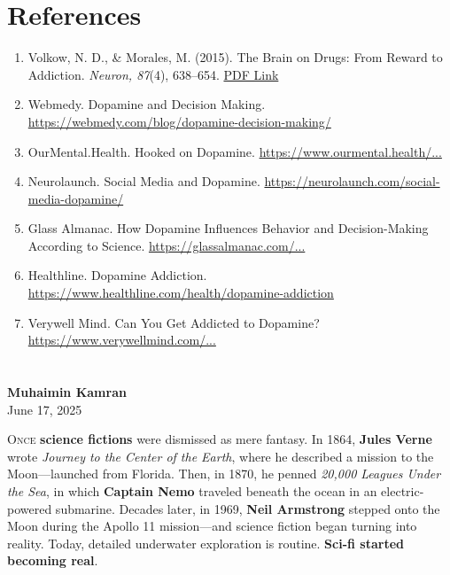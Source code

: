 \documentclass[a4paper,10pt,twocolumn]{memoir}
\newcommand{\article}[3]{
  \section*{#1}
  \addcontentsline{toc}{section}{#1}
  \begin{center}
    \color{dark}\normalsize\textbf{#2}\\
    \small\color{gray}#3
  \end{center}
  \vspace{-0.8em}  %
}
\begin{document}
\section*{References}

\begin{enumerate}
    \item Volkow, N. D., \& Morales, M. (2015). The Brain on Drugs: From Reward to Addiction. \textit{Neuron, 87}(4), 638–654. \href{https://www.cell.com/neuron/pdf/S0896-6273(15)00133-6.pdf}{PDF Link}
    \item Webmedy. Dopamine and Decision Making. \href{https://webmedy.com/blog/dopamine-decision-making/}{https://webmedy.com/blog/dopamine-decision-making/}
    \item OurMental.Health. Hooked on Dopamine. \href{https://www.ourmental.health/screen-time-sanity/hooked-on-dopamine-how-social-media-hijacks-your-brain}{https://www.ourmental.health/...}
    \item Neurolaunch. Social Media and Dopamine. \href{https://neurolaunch.com/social-media-dopamine/}{https://neurolaunch.com/social-media-dopamine/}
    \item Glass Almanac. How Dopamine Influences Behavior and Decision-Making According to Science. \href{https://glassalmanac.com/how-dopamine-influences-behavior-and-decision-making-according-to-science/}{https://glassalmanac.com/...}
    \item Healthline. Dopamine Addiction. \href{https://www.healthline.com/health/dopamine-addiction}{https://www.healthline.com/health/dopamine-addiction}
    \item Verywell Mind. Can You Get Addicted to Dopamine? \href{https://www.verywellmind.com/can-you-get-addicted-to-dopamine-5207433}{https://www.verywellmind.com/...}
\end{enumerate} 

\clearpage



\article{}{Muhaimin Kamran}{June 17, 2025}
\lettrine[lines=3]{O}{nce} \textbf{science fictions} were dismissed as mere fantasy. In 1864, \textbf{Jules Verne} wrote \textit{Journey to the Center of the Earth}, where he described a mission to the Moon—launched from Florida. Then, in 1870, he penned \textit{20,000 Leagues Under the Sea}, in which \textbf{Captain Nemo} traveled beneath the ocean in an electric-powered submarine. Decades later, in 1969, \textbf{Neil Armstrong} stepped onto the Moon during the Apollo 11 mission—and science fiction began turning into reality. Today, detailed underwater exploration is routine. \textbf{Sci-fi started becoming real}.
\end{document}
